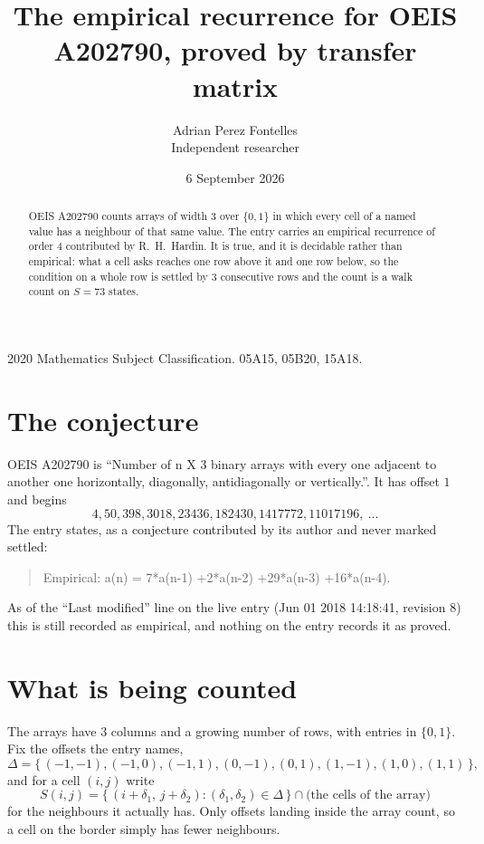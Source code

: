 \documentclass[11pt,a4paper]{article}
\title{The empirical recurrence for OEIS A202790, proved by transfer matrix}
\author{Adrian Perez Fontelles\\ \small Independent researcher}
\date{6 September 2026}
\theoremstyle{plain}
\theoremstyle{definition}
\begin{document}
\maketitle

\begin{abstract}
OEIS A202790 counts arrays of width $3$ over $\{0,1\}$ in which every cell of a named value has a neighbour of that same value. The entry carries an
empirical recurrence of order $4$ contributed by R.~H.~Hardin. It is true, and it is
decidable rather than empirical: what a cell asks reaches one row above it and one row below, so the
condition on a whole row is settled by $3$ consecutive rows and the count is a walk
count on $S=73$ states.
\end{abstract}

\noindent\small 2020 Mathematics Subject Classification. 05A15, 05B20, 15A18.\normalsize

\section{The conjecture}

OEIS A202790 is ``Number of n X 3 binary arrays with every one adjacent to another one horizontally, diagonally, antidiagonally or vertically.''. It has offset $1$ and begins
\[
4, 50, 398, 3018, 23436, 182430, 1417772, 11017196,\ \dots
\]
The entry states, as a conjecture contributed by its author and never marked settled:
\begin{quote}
Empirical: a(n) = 7*a(n-1) +2*a(n-2) +29*a(n-3) +16*a(n-4).
\end{quote}
As of the ``Last modified'' line on the live entry (Jun 01 2018 14:18:41, revision 8) this is still
recorded as empirical, and nothing on the entry records it as proved.

\section{What is being counted}

The arrays have $3$ columns and a growing number of rows, with entries in $\{0,1\}$. Fix the
offsets the entry names,
\[
\Delta=\{\,(-1,-1), (-1,0), (-1,1), (0,-1), (0,1), (1,-1), (1,0), (1,1)\,\},
\]
and for a cell $(i,j)$ write
\[
S(i,j)=\{\,(i+\delta_1,\,j+\delta_2) : (\delta_1,\delta_2)\in\Delta\,\}\cap
\text{(the cells of the array)}
\]
for the neighbours it actually has. Only offsets landing inside the array count, so a cell on
the border simply has fewer neighbours.
\end{document}
